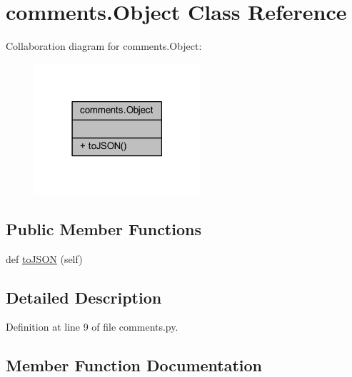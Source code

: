 \hypertarget{classcomments_1_1_object}{}\section{comments.\+Object Class Reference}
\label{classcomments_1_1_object}


Collaboration diagram for comments.\+Object\+:\nopagebreak
\begin{figure}[H]
\begin{center}
\leavevmode
\includegraphics[width=174pt]{classcomments_1_1_object__coll__graph}
\end{center}
\end{figure}
\subsection*{Public Member Functions}
\begin{DoxyCompactItemize}
\item 
def \hyperlink{classcomments_1_1_object_a28ae66a09cca16c0c2ef7f26a3add15e}{to\+J\+S\+ON} (self)
\end{DoxyCompactItemize}


\subsection{Detailed Description}


Definition at line 9 of file comments.\+py.



\subsection{Member Function Documentation}
\mbox{\label{classcomments_1_1_object_a28ae66a09cca16c0c2ef7f26a3add15e}} 
